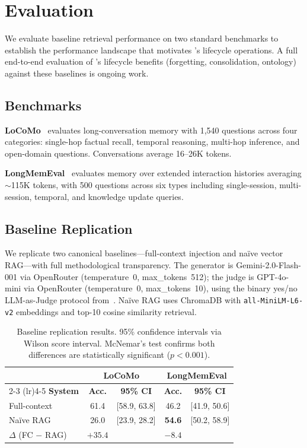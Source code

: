 \section{Evaluation}
\label{sec:evaluation}

We evaluate baseline retrieval performance on two standard benchmarks to
establish the performance landscape that motivates \alaya{}'s lifecycle
operations. A full end-to-end evaluation of \alaya{}'s lifecycle benefits
(forgetting, consolidation, ontology) against these baselines is ongoing
work.

\subsection{Benchmarks}

\textbf{LoCoMo}~\cite{maharana2024locomo} evaluates long-conversation
memory with 1,540 questions across four categories: single-hop factual
recall, temporal reasoning, multi-hop inference, and open-domain questions.
Conversations average 16--26K tokens.

\textbf{LongMemEval}~\cite{wu2025longmemeval} evaluates memory over
extended interaction histories averaging ${\sim}$115K tokens, with 500
questions across six types including single-session, multi-session, temporal,
and knowledge update queries.

\subsection{Baseline Replication}

We replicate two canonical baselines---full-context injection and na\"ive
vector RAG---with full methodological transparency. The generator is
Gemini-2.0-Flash-001 via OpenRouter (temperature~0, max\_tokens~512); the
judge is GPT-4o-mini via OpenRouter (temperature~0, max\_tokens~10), using
the binary yes/no LLM-as-Judge protocol from~\cite{maharana2024locomo}.
Na\"ive RAG uses ChromaDB with \texttt{all-MiniLM-L6-v2} embeddings and
top-10 cosine similarity retrieval.

\begin{table}[!t]
\centering
\caption{Baseline replication results. 95\% confidence intervals via Wilson
score interval. McNemar's test confirms both differences are statistically
significant ($p < 0.001$).}
\label{tab:baselines}
\small
\begin{tabular}{@{}lcccc@{}}
\toprule
& \multicolumn{2}{c}{\textbf{LoCoMo}} & \multicolumn{2}{c}{\textbf{LongMemEval}} \\
\cmidrule(lr){2-3} \cmidrule(lr){4-5}
\textbf{System} & \textbf{Acc.} & \textbf{95\% CI} & \textbf{Acc.} & \textbf{95\% CI} \\
\midrule
Full-context & 61.4 & [58.9, 63.8] & 46.2 & [41.9, 50.6] \\
Na\"ive RAG  & 26.0 & [23.9, 28.2] & \textbf{54.6} & [50.2, 58.9] \\
\midrule
$\Delta$ (FC $-$ RAG) & $+35.4$ & & $-8.4$ & \\
\bottomrule
\end{tabular}
\end{table}

